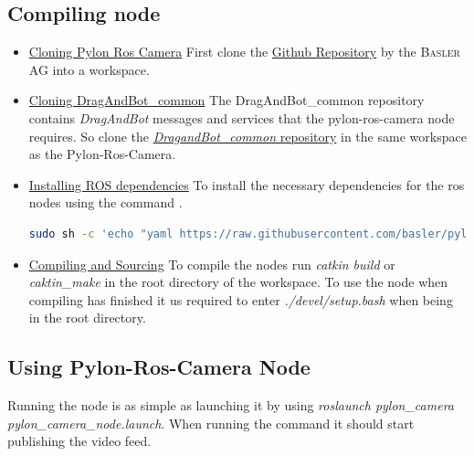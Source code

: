\subsection{Compiling node}

\begin{itemize}
    \item \underline{Cloning Pylon Ros Camera} \newline
    First clone the \href{https://github.com/basler/pylon-ros-camera}{Github Repository} by the \cite{pylonroscamera} \textsc{Basler AG} into a workspace.
    
    \item \underline{Cloning DragAndBot\_common} \newline
    The DragAndBot\_common repository contains \textit{DragAndBot} messages and services that the pylon-\gls{ros}-camera node requires.
    So clone the \href{https://github.com/dragandbot/dragandbot_common}{\textit{DragandBot\_common} repository} \cite{dragandbotcommon} in the same workspace as the Pylon-Ros-Camera.
    
    \item \underline{Installing ROS dependencies} \newline
    To install the necessary dependencies for the \gls{ros} nodes using the command \cite{code:installdeppylonroscamera}.
    \begin{lstlisting}[language=bash, caption={Installing dependencies for Pylon-Ros-Camera}, label={code:installdeppylonroscamera}]
sudo sh -c 'echo "yaml https://raw.githubusercontent.com/basler/pylon-ros-camera/master/pylon_camera/rosdep/pylon_sdk.yaml" > /etc/ros/rosdep/sources.list.d/30-pylon_camera.list' && rosdep update && sudo rosdep install --from-paths . --ignore-src --rosdistro=$ROS_DISTRO -y
    \end{lstlisting}
    
    \item \underline{Compiling and Sourcing} \newline
    To compile the nodes run \textit{catkin build} or \textit{caktin\_make} in the root directory of the workspace.\newline
    To use the node when compiling has finished it us required to enter \textit{./devel/setup.bash} when being in the root directory.
\end{itemize}

\subsection{Using Pylon-Ros-Camera Node}
Running the node is as simple as launching it by using \textit{roslaunch pylon\_camera pylon\_camera\_node.launch}. When running the command it should start publishing the video feed.